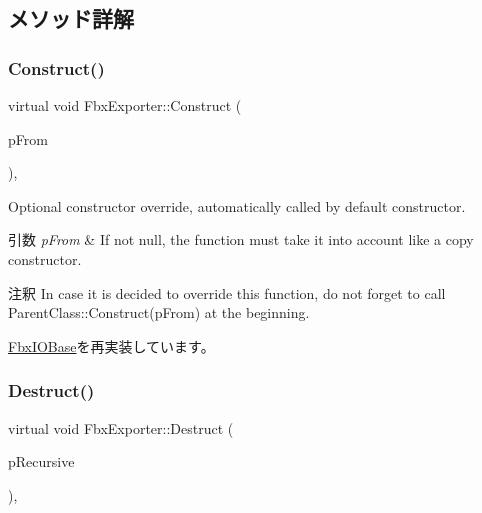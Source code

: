 \subsection{メソッド詳解}
\mbox{\label{class_fbx_exporter_aa308b9a9901e8c98d0b54f0bd20daad2}} 
\subsubsection{\texorpdfstring{Construct()}{Construct()}}
{\footnotesize\ttfamily virtual void Fbx\+Exporter\+::\+Construct (\begin{DoxyParamCaption}\item[{const \hyperlink{class_fbx_object}{Fbx\+Object} $\ast$}]{p\+From }\end{DoxyParamCaption})\hspace{0.3cm}{\ttfamily [protected]}, {\ttfamily [virtual]}}

Optional constructor override, automatically called by default constructor. 
\begin{DoxyParams}{引数}
{\em p\+From} & If not null, the function must take it into account like a copy constructor. \\
\hline
\end{DoxyParams}
\begin{DoxyRemark}{注釈}
In case it is decided to override this function, do not forget to call Parent\+Class\+::\+Construct(p\+From) at the beginning. 
\end{DoxyRemark}


\hyperlink{class_fbx_i_o_base_aed70ed1326f8fb1cc96e2086c73722f8}{Fbx\+I\+O\+Base}を再実装しています。

\mbox{\label{class_fbx_exporter_a0a2569f6ed2ffaa165d9bdb1959f0599}} 
\subsubsection{\texorpdfstring{Destruct()}{Destruct()}}
{\footnotesize\ttfamily virtual void Fbx\+Exporter\+::\+Destruct (\begin{DoxyParamCaption}\item[{bool}]{p\+Recursive }\end{DoxyParamCaption})\hspace{0.3cm}{\ttfamily [protected]}, {\ttfamily [virtual]}}

